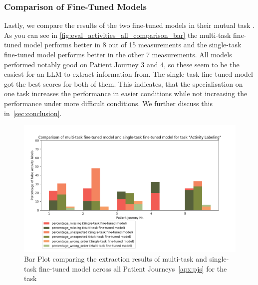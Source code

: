 \subsubsection{Comparison of Fine-Tuned Models}
Lastly, we compare the results of the two fine-tuned models in their mutual task . As you can see in \autoref{fig:eval_activities_all_comparison_bar} the multi-task fine-tuned model performs better in 8 out of 15 measurements and the single-task fine-tuned model performs better in the other 7 measurements. All models performed notably good on Patient Journey 3 and 4, so these seem to be the easiest for an LLM to extract information from. The single-task fine-tuned model got the best scores for both of them. This indicates, that the specialisation on one task increases the performance in easier conditions while not increasing the performance under more difficult conditions. We further discuss this in~\autoref{sec:conclusion}.

\begin{figure}
    \centering
    \includegraphics[width=\textwidth]{bachelor_thesis/images/activites_all-single_vs_multi.png}
    \caption{Bar Plot comparing the extraction results of multi-task and single-task fine-tuned model across all Patient Journeys~\ref{apx:pjs} for the task } 
    \label{fig:eval_activities_all_comparison_bar}
\end{figure}

